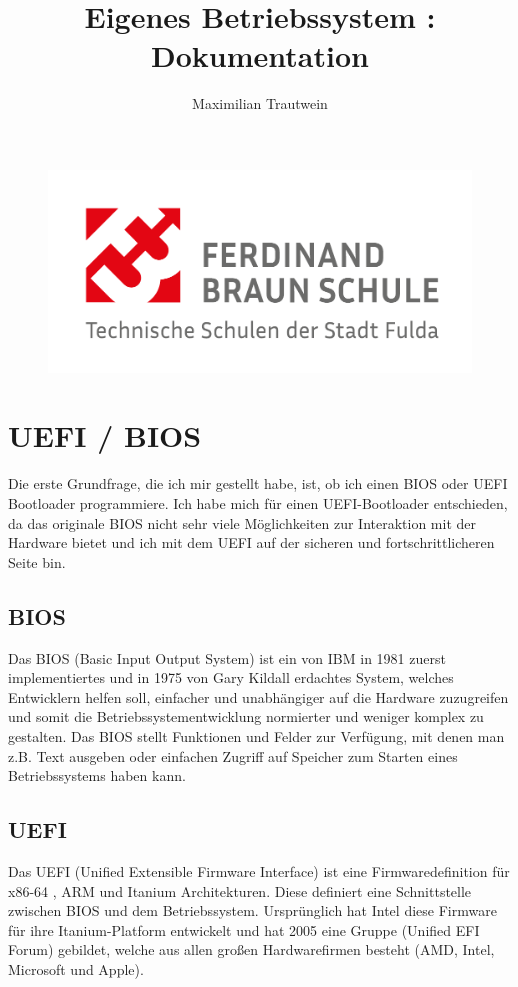 \documentclass[12pt]{article}
\title{Eigenes Betriebssystem : Dokumentation}
\author{Maximilian Trautwein}
\begin{document}
	
	\maketitle
	
	\begin{figure}[h]
		\centering
		\includegraphics[width=\textwidth]{FBS-Logo_2021-1}
	\end{figure}
	
	\newpage
	\tableofcontents
	
	\newpage
	
	\section{UEFI / BIOS}
	Die erste Grundfrage, die ich mir gestellt habe, ist, ob ich einen BIOS\cite{bios} oder UEFI Bootloader\cite{uefi} programmiere. Ich habe mich für einen UEFI-Bootloader\cite{uefi} entschieden, da das originale BIOS\cite{bios} nicht sehr viele Möglichkeiten zur Interaktion mit der Hardware bietet und ich mit dem UEFI\cite{uefi} auf der sicheren und fortschrittlicheren Seite bin. 
	\subsection{BIOS}
 	Das BIOS\cite{bios} (Basic Input Output System) ist ein von IBM in 1981 zuerst implementiertes und in 1975 von Gary Kildall erdachtes System, welches Entwicklern helfen soll, einfacher und unabhängiger auf die Hardware zuzugreifen und somit die Betriebssystementwicklung normierter und weniger komplex zu gestalten. Das BIOS\cite{bios} stellt Funktionen und Felder zur Verfügung, mit denen man z.B. Text ausgeben oder einfachen Zugriff auf Speicher zum Starten eines Betriebssystems haben kann. 
 	\subsection{UEFI} 
 	Das UEFI\cite{uefi} (Unified Extensible Firmware Interface) ist eine Firmwaredefinition für x86-64 , ARM und Itanium Architekturen. Diese definiert eine Schnittstelle zwischen BIOS\cite{bios} und dem Betriebssystem. Ursprünglich hat Intel diese Firmware für ihre Itanium-Platform entwickelt und hat 2005 eine Gruppe (Unified EFI Forum) gebildet, welche aus allen großen Hardwarefirmen besteht (AMD, Intel, Microsoft und Apple).
	
\end{document}
